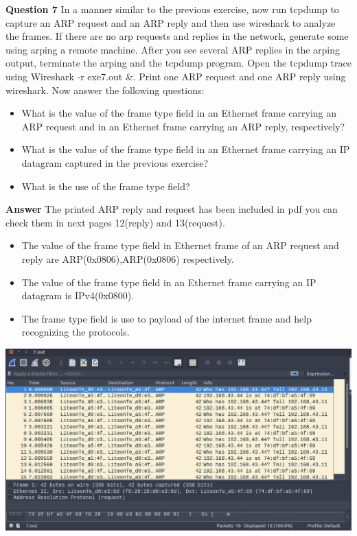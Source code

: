 \documentclass[14pt]{extarticle}
\begin{document}
    \noindent
    \textbf{\large Question 7}
    In a manner similar to the previous exercise, now run tcpdump to capture an ARP request and an ARP
    reply and then use wireshark to analyze the frames. If there are no arp requests and replies in the
    network, generate some using arping a remote machine. After you see several ARP replies in the arping
    output, terminate the arping and the tcpdump program. Open the tcpdump trace using Wireshark -r
    exe7.out \&. Print one ARP request and one ARP reply using wireshark. Now answer the following
    questions:
    \begin{itemize}
        \item What is the value of the frame type field in an Ethernet frame carrying an ARP request and in an
        Ethernet frame carrying an ARP reply, respectively?
        \item What is the value of the frame type field in an Ethernet frame carrying an IP datagram captured
        in the previous exercise?
        \item What is the use of the frame type field?
    \end{itemize}
    \textbf{\large Answer}
    The printed ARP reply and request has been included in pdf you can check them in next pages 12(reply) and 13(request). 
    \begin{itemize}
        \item The value of the frame type field in Ethernet frame of an ARP request and reply are ARP(0x0806),ARP(0x0806) respectively.
        \item The value of the frame type field in an Ethernet frame carrying an IP datagram is IPv4(0x0800).
        \item The frame type field is use to payload of the internet frame and help recognizing the protocols.
    \end{itemize}
    
    
    \includegraphics[scale=0.42]{7}
    \vspace{1cm}
\end{document}
